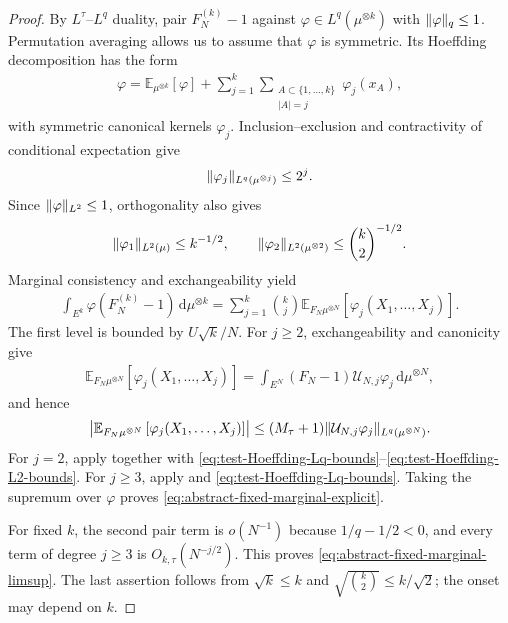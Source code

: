 \documentclass[11pt,reqno]{amsart}
\numberwithin{equation}{section}
\theoremstyle{plain}
\theoremstyle{remark}
\DeclarePairedDelimiter{\norm}{\lVert}{\rVert}
\newcommand{\md}{\mathrm{d}}
\newcommand{\E}{{\mathbb{E}}}
\begin{document}
\begin{proof}
By \(L^\tau\)--\(L^q\) duality, pair \(F_N^{(k)}-1\) against \(\varphi\in L^q(\mu^{\otimes k})\) with \(\norm\varphi_q\le1\).  Permutation averaging allows us to assume that \(\varphi\) is symmetric.  Its Hoeffding decomposition has the form
\begin{align}\label{eq:test-Hoeffding-decomposition}
 \varphi
 =\E_{\mu^{\otimes k}}\left[\varphi\right]
 +\sum_{j=1}^k\sum_{\substack{A\subset\{1,\ldots,k\}\\|A|=j}}
 \varphi_j(x_A),
\end{align}
with symmetric canonical kernels \(\varphi_j\).  Inclusion--exclusion and contractivity of conditional expectation give
\begin{align}\label{eq:test-Hoeffding-Lq-bounds}
 \norm{\varphi_j}_{L^q(\mu^{\otimes j})}\le2^j.
\end{align}
Since \(\norm\varphi_{L^2}\le1\), orthogonality also gives
\begin{align}\label{eq:test-Hoeffding-L2-bounds}
 \norm{\varphi_1}_{L^2(\mu)}\le k^{-1/2},
 \qquad
 \norm{\varphi_2}_{L^2(\mu^{\otimes2})}
 \le \binom{k}{2}^{-1/2}.
\end{align}
Marginal consistency and exchangeability yield
\begin{align}\label{eq:fixed-marginal-pairing-levels}
 \int_{E^k}\varphi(F_N^{(k)}-1)\,\md\mu^{\otimes k}
 =\sum_{j=1}^k\binom{k}{j}
 \E_{F_N\mu^{\otimes N}}\left[\varphi_j(X_1,\ldots,X_j)\right].
\end{align}
The first level is bounded by \(U\sqrt{k}/N\).  For \(j\ge2\), exchangeability and canonicity give
\begin{align}\label{eq:fixed-marginal-U-duality}
 \E_{F_N\mu^{\otimes N}}\left[\varphi_j(X_1,\ldots,X_j)\right]
 =\int_{E^N}(F_N-1)\mathcal U_{N,j}\varphi_j\,\md\mu^{\otimes N},
\end{align}
and hence
\begin{align}\label{eq:fixed-marginal-Holder-U}
 \left|\E_{F_N\mu^{\otimes N}}\left[\varphi_j(X_1,\ldots,X_j)\right]\right|
 \le(M_\tau+1)\norm{\mathcal U_{N,j}\varphi_j}_{L^q(\mu^{\otimes N})}.
\end{align}
For \(j=2\), apply  together with \eqref{eq:test-Hoeffding-Lq-bounds}--\eqref{eq:test-Hoeffding-L2-bounds}.  For \(j\ge3\), apply  and \eqref{eq:test-Hoeffding-Lq-bounds}.  Taking the supremum over \(\varphi\) proves \eqref{eq:abstract-fixed-marginal-explicit}.

For fixed \(k\), the second pair term is \(o(N^{-1})\) because \(1/q-1/2<0\), and every term of degree \(j\ge3\) is \(O_{k,\tau}(N^{-j/2})\).  This proves \eqref{eq:abstract-fixed-marginal-limsup}.  The last assertion follows from \(\sqrt{k}\le k\) and \(\sqrt{\binom{k}{2}}\le k/\sqrt2\); the onset may depend on \(k\).
\end{proof}
\end{document}
